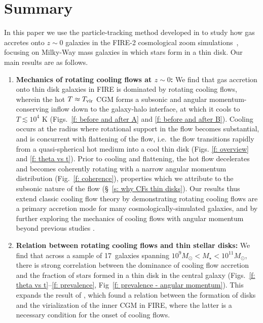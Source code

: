 \documentclass[fleqn,usenatbib]{mnras}
\newcommand{\Nsample}{17}
\begin{document}
\section{Summary}
\label{s: conclusions}

In this paper we use the particle-tracking method developed in \cite{Hafen2019,Hafen2020} to study how gas accretes onto $z\sim0$ galaxies in the FIRE-2 cosmological zoom simulations~\citep{Hopkins2018}, focusing on Milky-Way mass galaxies in which stars form in a thin disk. 
Our main results are as follows.
\begin{enumerate}
    \item \textbf{Mechanics of rotating cooling flows at $z \sim 0$:}
    We find that gas accretion onto thin disk galaxies in FIRE is dominated by rotating cooling flows, wherein the hot $T\approx T_{\rm vir}$ CGM forms a subsonic and angular momentum-conserving inflow down to the galaxy-halo interface, at which it cools to $T\lesssim10^4$ K (Figs.~\ref{f: before and after A} and \ref{f: before and after B}).
    Cooling occurs at the radius where rotational support in the flow becomes substantial, and is concurrent with flattening of the flow, i.e.~the flow transitions rapidly from a quasi-spherical hot medium into a cool thin disk (Figs. \ref{f: overview} and \ref{f: theta vs t}).
    Prior to cooling and flattening, the hot flow decelerates and becomes coherently rotating with a narrow angular momentum distribution (Fig.~\ref{f: coherence}), properties which we attribute to the subsonic nature of the flow (\S~\ref{s: why CFs thin disks}).
    Our results thus extend classic cooling flow theory by demonstrating rotating cooling flows are a primary accretion mode for many cosmologically-simulated galaxies, and by further exploring the mechanics of cooling flows with angular momentum beyond previous studies \citep{Cowie1980, Stern2020}. 
    \item \textbf{Relation between rotating cooling flows and thin stellar disks:}
    We find that across a sample of \Nsample~galaxies spanning $10^9 M_\odot < M_\star < 10^{11} M_\odot$, there is strong correlation between the dominance of cooling flow accretion and the fraction of stars formed in a thin disk in the central galaxy (Figs.~\ref{f: theta vs t}--\ref{f: prevalence}, Fig~\ref{f: prevalence - angular momentum}).
    This expands the result of \cite{Stern2021}, which found a relation between the formation of disks and the virialization of the inner CGM in FIRE, where the latter is a necessary condition for the onset of cooling flows. 

\end{enumerate}
\end{document}
